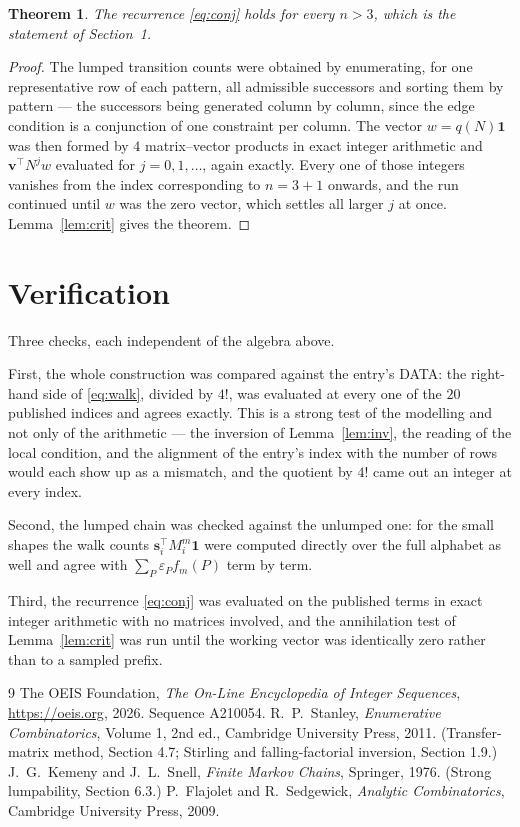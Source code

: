 \documentclass[11pt,a4paper]{article}
\theoremstyle{plain}
\newtheorem{theorem}{Theorem}
\theoremstyle{definition}
\begin{document}
\begin{theorem}
The recurrence \eqref{eq:conj} holds for every $n>3$, which is the statement of
Section~1.
\end{theorem}

\begin{proof}
The lumped transition counts were obtained by enumerating, for one representative row of
each pattern, all admissible successors and sorting them by pattern --- the successors being
generated column by column, since the edge condition is a conjunction of one constraint per
column. The vector $w=q(N)\mathbf{1}$ was then formed by $4$ matrix--vector products
in exact integer arithmetic and $\mathbf{v}^{\!\top}N^{j}w$ evaluated for
$j=0,1,\dots$, again exactly. Every one of those integers vanishes from the index
corresponding to $n=3+1$ onwards, and the run continued until $w$ was the zero vector,
which settles all larger $j$ at once. Lemma~\ref{lem:crit} gives the theorem.
\end{proof}

\section{Verification}

Three checks, each independent of the algebra above.

First, the whole construction was compared against the entry's DATA: the right-hand side of
\eqref{eq:walk}, divided by $4!$, was evaluated at every one of the $20$
published indices and agrees exactly. This is a strong test of the modelling and not only of
the arithmetic --- the inversion of Lemma~\ref{lem:inv}, the reading of the local
condition, and the alignment of the entry's index with the number of rows would each
show up as a mismatch, and the quotient by $4!$ came out an integer at every index.

Second, the lumped chain was checked against the unlumped one: for the small shapes the walk
counts $\mathbf{s}_i^{\!\top}M_i^{m}\mathbf{1}$ were computed directly over the full
alphabet as well and agree with $\sum_P\varepsilon_Pf_m(P)$ term by term.

Third, the recurrence \eqref{eq:conj} was evaluated on the published terms in exact integer
arithmetic with no matrices involved, and the annihilation test of Lemma~\ref{lem:crit} was
run until the working vector was identically zero rather than to a sampled prefix.

\begin{thebibliography}{9}
 The OEIS Foundation, \emph{The On-Line Encyclopedia of Integer
Sequences}, \url{https://oeis.org}, 2026. Sequence A210054.
 R.~P.~Stanley, \emph{Enumerative Combinatorics}, Volume 1, 2nd ed.,
Cambridge University Press, 2011. (Transfer-matrix method, Section 4.7; Stirling and
falling-factorial inversion, Section 1.9.)
 J.~G.~Kemeny and J.~L.~Snell, \emph{Finite Markov Chains}, Springer,
1976. (Strong lumpability, Section 6.3.)
 P.~Flajolet and R.~Sedgewick, \emph{Analytic Combinatorics}, Cambridge
University Press, 2009.
\end{thebibliography}
\end{document}
